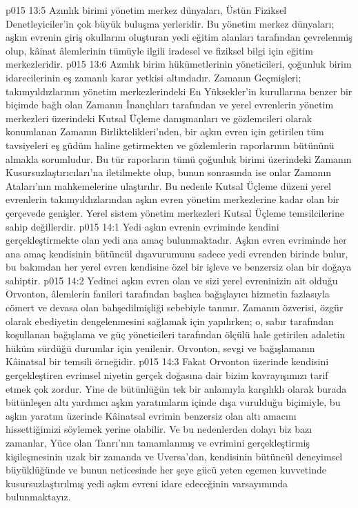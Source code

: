 \vs p015 13:5 Azınlık birimi yönetim merkez dünyaları, Üstün Fiziksel Denetleyiciler’in çok büyük buluşma yerleridir. Bu yönetim merkez dünyaları; aşkın evrenin giriş okullarını oluşturan yedi eğitim alanları tarafından çevrelenmiş olup, kâinat âlemlerinin tümüyle ilgili iradesel ve fiziksel bilgi için eğitim merkezleridir.
\vs p015 13:6 Azınlık birim hükümetlerinin yöneticileri, çoğunluk birim idarecilerinin eş zamanlı karar yetkisi altındadır. Zamanın Geçmişleri; takımyıldızlarının yönetim merkezlerindeki En Yüksekler’in kurullarına benzer bir biçimde bağlı olan Zamanın İnançlıları tarafından ve yerel evrenlerin yönetim merkezleri üzerindeki Kutsal Üçleme danışmanları ve gözlemcileri olarak konumlanan Zamanın Birliktelikleri’nden, bir aşkın evren için getirilen tüm tavsiyeleri eş güdüm haline getirmekten ve gözlemlerin raporlarının bütününü almakla sorumludur. Bu tür raporların tümü çoğunluk birimi üzerindeki Zamanın Kusursuzlaştırıcıları’na iletilmekte olup, bunun sonrasında ise onlar Zamanın Ataları’nın mahkemelerine ulaştırılır. Bu nedenle Kutsal Üçleme düzeni yerel evrenlerin takımyıldızlarından aşkın evren yönetim merkezlerine kadar olan bir çerçevede genişler. Yerel sistem yönetim merkezleri Kutsal Üçleme temsilcilerine sahip değillerdir.
\vs p015 14:1 Yedi aşkın evrenin evriminde kendini gerçekleştirmekte olan yedi ana amaç bulunmaktadır. Aşkın evren evriminde her ana amaç kendisinin bütüncül dışavurumunu sadece yedi evrenden birinde bulur, bu bakımdan her yerel evren kendisine özel bir işleve ve benzersiz olan bir doğaya sahiptir.
\vs p015 14:2 Yedinci aşkın evren olan ve sizi yerel evreninizin ait olduğu Orvonton, âlemlerin fanileri tarafından başlıca bağışlayıcı hizmetin fazlasıyla cömert ve devasa olan bahşedilmişliği sebebiyle tanınır. Zamanın özverisi, özgür olarak ebediyetin dengelenmesini sağlamak için yapılırken; o, sabır tarafından koşullanan bağışlama ve güç yöneticileri tarafından ölçülü hale getirilen adaletin hüküm sürdüğü durumlar için yenilenir. Orvonton, sevgi ve bağışlamanın Kâinatsal bir temsili örneğidir.
\vs p015 14:3 Fakat Orvonton üzerinde kendisini gerçekleştiren evrimsel niyetin gerçek doğasına dair bizim kavrayışımızı tarif etmek çok zordur. Yine de bütünlüğün tek bir anlamıyla karşılıklı olarak burada bütünleşen altı yardımcı aşkın yaratımların içinde dışa vurulduğu biçimiyle, bu aşkın yaratım üzerinde Kâinatsal evrimin benzersiz olan altı amacını hissettiğimizi söylemek yerine olabilir. Ve bu nedenlerden dolayı biz bazı zamanlar, Yüce olan Tanrı’nın tamamlanmış ve evrimini gerçekleştirmiş kişileşmesinin uzak bir zamanda ve Uversa’dan, kendisinin bütüncül deneyimsel büyüklüğünde ve bunun neticesinde her şeye gücü yeten egemen kuvvetinde kusursuzlaştırılmış yedi aşkın evreni idare edeceğinin varsayımında bulunmaktayız.
